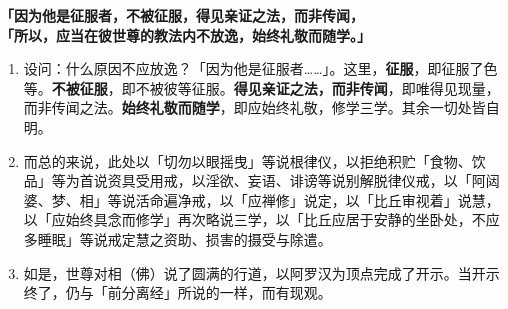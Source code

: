 \textbf{「因为他是征服者，不被征服，得见亲证之法，而非传闻，\\}
\textbf{「所以，应当在彼世尊的教法内不放逸，始终礼敬而随学。」}

\begin{enumerate}\item 设问：什么原因不应放逸？「因为他是征服者……」。这里，\textbf{征服}，即征服了色等。\textbf{不被征服}，即不被彼等征服。\textbf{得见亲证之法，而非传闻}，即唯得见现量，而非传闻之法。\textbf{始终礼敬而随学}，即应始终礼敬，修学三学。其余一切处皆自明。
\item 而总的来说，此处以「切勿以眼摇曳」等说根律仪，以拒绝积贮「食物、饮品」等为首说资具受用戒，以淫欲、妄语、诽谤等说别解脱律仪戒，以「阿闼婆、梦、相」等说活命遍净戒，以「应禅修」说定，以「比丘审视着」说慧，以「应始终具念而修学」再次略说三学，以「比丘应居于安静的坐卧处，不应多睡眠」等说戒定慧之资助、损害的摄受与除遣。
\item 如是，世尊对相（佛）说了圆满的行道，以阿罗汉为顶点完成了开示。当开示终了，仍与「前分离经」所说的一样，而有现观。\end{enumerate}

